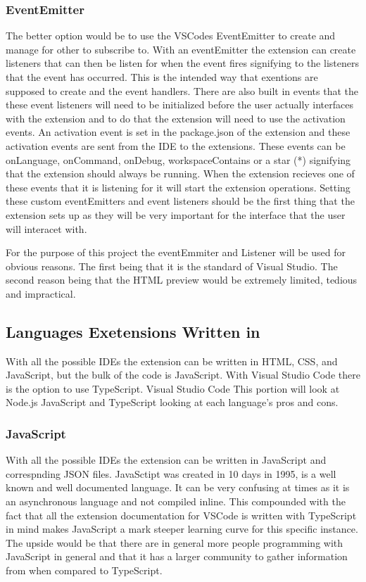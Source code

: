 \documentclass[letterpaper,10pt,titlepage,draftclsnofoot,onecolumn,onesided] {IEEEtran}
\begin{document}
\subsubsection{EventEmitter}
The better option would be to use the VSCodes EventEmitter to create and manage for other to subscribe to. 
With an eventEmitter the extension can create listeners that can then be listen for when the event fires signifying to the listeners that the event has occurred. 
This is the intended way that exentions are supposed to create and the event handlers. 
There are also built in events that the these event listeners will need to be initialized before the user actually interfaces with the extension and to do that the extension will need to use the activation events. 
An activation event is set in the package.json of the extension and these activation events are sent from the IDE to the extensions.
These events can be onLanguage, onCommand, onDebug, workspaceContains or a star (*) signifying that the extension should always be running. 
When the extension recieves one of these events that it is listening for it will start the extension operations. 
Setting these custom eventEmitters and event listeners should be the first thing that the extension sets up as they will be very important for the interface that the user will interacet with. \cite{VSCodeDocumentation}

For the purpose of this project the eventEmmiter and Listener will be used for obvious reasons. 
The first being that it is the standard of Visual Studio. 
The second reason being that the HTML preview would be extremely limited, tedious and impractical.

\subsection{Languages Exetensions Written in}
With all the possible IDEs the extension can be written in HTML, CSS, and JavaScript, but the bulk of the code is  JavaScript. 
With Visual Studio Code there is the option to use TypeScript. 
Visual Studio Code 
This portion will look at Node.js JavaScript and TypeScript looking at each language's pros and cons.
\subsubsection{JavaScript}
With all the possible IDEs the extension can be written in JavaScript  and correspnding JSON files. 
JavaSctipt was created in 10 days in 1995, is a well known and well documented language. \cite{JavaScriptHistory}
It can be very confusing at times as it is an asynchronous language and not compiled inline.
This compounded with the fact that all the extension documentation for VSCode is written with TypeScript in mind makes JavaScript a mark steeper learning curve for this specific instance. 
The upside would be that there are in general more people programming with JavaScript in general and that it has a larger community to gather information from when compared to TypeScript. 
\end{document}
